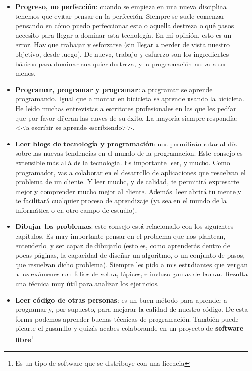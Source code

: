 \begin{itemize}
 \item \textbf{Progreso, no perfección}: cuando se empieza en una nueva disciplina tenemos que evitar pensar en la perfección. Siempre se suele
 comenzar pensando en cómo puedo perfeccionar esta o aquella destreza o qué pasos necesito para llegar a dominar esta tecnología. En mi 
 opinión, esto es un error. Hay que trabajar y esforzarse (sin llegar a perder de vista nuestro objetivo, desde luego). De nuevo, trabajo
 y esfuerzo son los ingredientes básicos para dominar cualquier destreza, y la programación no va a ser menos.
 \item \textbf{Programar, programar y programar}: a programar se aprende programando. Igual que a montar en bicicleta se aprende usando la bicicleta. 
 He leído muchas entrevistas a escritores profesionales en las que les pedían que por favor dijeran las claves de su éxito. La mayoría
 siempre respondía: <<a escribir se aprende escribiendo>>.
 \item \textbf{Leer blogs de tecnología y programación}: nos permitirán estar al día sobre las nuevas tendencias en el mundo de la programación. 
 Este consejo es extensible más allá de la tecnología. Es importante leer, y mucho. Como programador, vas a colaborar en el desarrollo
 de aplicaciones que resuelvan el problema de un cliente. Y leer mucho, y de calidad, te permitirá expresarte mejor y comprender mucho
 mejor al cliente. Además, leer abrirá tu mente y te facilitará cualquier proceso de aprendizaje (ya sea en el mundo de la informática o en 
 otro campo de estudio).
 \item \textbf{Dibujar los problemas}: este consejo está relacionado con los siguientes capítulos. Es muy importante
 pensar en el problema que nos plantean, entenderlo, y ser capaz de dibujarlo (esto es, como aprenderás dentro de pocas páginas, la capacidad de diseñar un 
 algoritmo, o un conjunto de pasos, que resuelvan dicho problema). Siempre les pido a mis estudiantes que vengan a los exámenes con folios de sobra,
 lápices, e incluso gomas de borrar. Resulta una técnica muy útil para analizar los ejercicios.
 \item \textbf{Leer código de otras personas}: es un buen método para aprender a programar y, por supuesto, para mejorar la calidad de
 nuestro código. De esta forma podemos aprender buenas técnicas de programación. También puede picarte el gusanillo y quizás acabes
 colaborando en un proyecto de \textbf{software libre}\footnote{Es un tipo de software que se distribuye con una licencia
}
\end{itemize}
